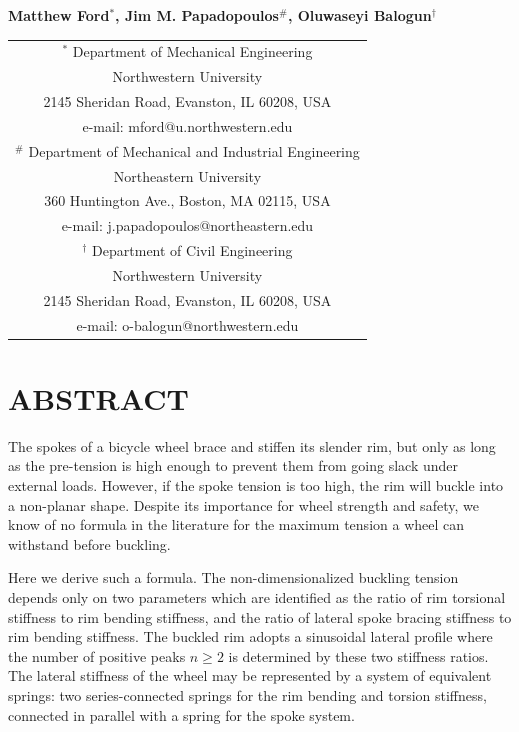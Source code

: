 \documentclass{bmd2016p}
\begin{document}
\begin{center}
\end{center}

\begin{center}
\normalsize{\bf{Matthew Ford$^{*}$, Jim M. Papadopoulos$^\#$, 
            Oluwaseyi Balogun$^\dag$}}
\end{center} 

\begin{center}
\begin{tabular}{c}
$^*$ Department of Mechanical Engineering\\
Northwestern University\\
2145 Sheridan Road, Evanston, IL 60208, USA\\
e-mail: mford@u.northwestern.edu\\[2.5ex]

$^\#$ Department of Mechanical and Industrial Engineering\\
Northeastern University\\
360 Huntington Ave., Boston, MA 02115, USA\\
e-mail: j.papadopoulos@northeastern.edu\\[2.5ex]

$^\dag$ Department of Civil Engineering\\
Northwestern University\\
2145 Sheridan Road, Evanston, IL 60208, USA\\
e-mail: o-balogun@northwestern.edu\\
\end{tabular}
\end{center}

\section*{ABSTRACT}
The spokes of a bicycle wheel brace and stiffen its slender rim, but only as long as the pre-tension is high enough to prevent them from going slack under external loads. However, if the spoke tension is too high, the rim will buckle into a non-planar shape. Despite its importance for wheel strength and safety, we know of no formula in the literature for the maximum tension a wheel can withstand before buckling.

Here we derive such a formula. The non-dimensionalized buckling tension depends only on two parameters which are identified as the ratio of rim torsional stiffness to rim bending stiffness, and the ratio of lateral spoke bracing stiffness to rim bending stiffness. The buckled rim adopts a sinusoidal lateral profile where the number of positive peaks $n\geq 2$ is determined by these two stiffness ratios. The lateral stiffness of the wheel may be represented by a system of equivalent springs: two series-connected springs for the rim bending and torsion stiffness, connected in parallel with a spring for the spoke system.
\end{document}
